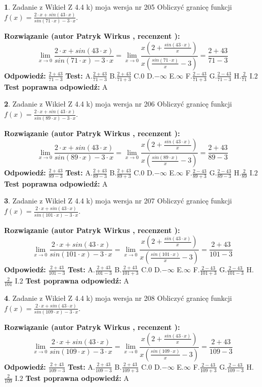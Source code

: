 \documentclass[12pt, a4paper]{article}
\theoremstyle{definition} %
\newtheorem{zad}{}
\newcommand{\zadStart}[1]{\begin{zad}#1\newline}
\newcommand{\zadStop}{\end{zad}}
\newcommand{\rozwStart}[2]{\noindent \textbf{Rozwiązanie (autor #1 , recenzent #2): }\newline}
\newcommand{\rozwStop}{\newline}
\newcommand{\odpStart}{\noindent \textbf{Odpowiedź:}\newline}
\newcommand{\odpStop}{\newline}
\newcommand{\testStart}{\noindent \textbf{Test:}\newline}
\newcommand{\testStop}{\newline}
\newcommand{\kluczStart}{\noindent \textbf{Test poprawna odpowiedź:}\newline}
\newcommand{\kluczStop}{\newline}
\begin{document}
\zadStart{Zadanie z Wikieł Z 4.4 k) moja wersja nr 205}
Obliczyć granicę funkcji $f(x)=\frac{2\cdot x +sin(43\cdot x)}{sin(71\cdot x) -3\cdot x}$.
\zadStop
\rozwStart{Patryk Wirkus}{}
$$\lim\limits_{x\to 0}\frac{2\cdot x +sin(43\cdot x)}{sin(71\cdot x) -3\cdot x}
=\lim\limits_{x\to 0}\frac{x(2+\frac{sin(43\cdot x)}{x})}{x(\frac{sin(71\cdot x)}{x}-3)}
=\frac{2+43}{71-3}$$
\rozwStop
\odpStart
$\frac{2+43}{71-3}$
\odpStop
\testStart
A.$\frac{2+43}{71-3}$
B.$\frac{2+43}{71+3}$
C.$0$
D.$-\infty$
E.$\infty$
F.$\frac{2-43}{71+3}$
G.$\frac{2-43}{71-3}$
H.$\frac{2}{71}$
I.$2$
\testStop
\kluczStart
A
\kluczStop



\zadStart{Zadanie z Wikieł Z 4.4 k) moja wersja nr 206}
Obliczyć granicę funkcji $f(x)=\frac{2\cdot x +sin(43\cdot x)}{sin(89\cdot x) -3\cdot x}$.
\zadStop
\rozwStart{Patryk Wirkus}{}
$$\lim\limits_{x\to 0}\frac{2\cdot x +sin(43\cdot x)}{sin(89\cdot x) -3\cdot x}
=\lim\limits_{x\to 0}\frac{x(2+\frac{sin(43\cdot x)}{x})}{x(\frac{sin(89\cdot x)}{x}-3)}
=\frac{2+43}{89-3}$$
\rozwStop
\odpStart
$\frac{2+43}{89-3}$
\odpStop
\testStart
A.$\frac{2+43}{89-3}$
B.$\frac{2+43}{89+3}$
C.$0$
D.$-\infty$
E.$\infty$
F.$\frac{2-43}{89+3}$
G.$\frac{2-43}{89-3}$
H.$\frac{2}{89}$
I.$2$
\testStop
\kluczStart
A
\kluczStop



\zadStart{Zadanie z Wikieł Z 4.4 k) moja wersja nr 207}
Obliczyć granicę funkcji $f(x)=\frac{2\cdot x +sin(43\cdot x)}{sin(101\cdot x) -3\cdot x}$.
\zadStop
\rozwStart{Patryk Wirkus}{}
$$\lim\limits_{x\to 0}\frac{2\cdot x +sin(43\cdot x)}{sin(101\cdot x) -3\cdot x}
=\lim\limits_{x\to 0}\frac{x(2+\frac{sin(43\cdot x)}{x})}{x(\frac{sin(101\cdot x)}{x}-3)}
=\frac{2+43}{101-3}$$
\rozwStop
\odpStart
$\frac{2+43}{101-3}$
\odpStop
\testStart
A.$\frac{2+43}{101-3}$
B.$\frac{2+43}{101+3}$
C.$0$
D.$-\infty$
E.$\infty$
F.$\frac{2-43}{101+3}$
G.$\frac{2-43}{101-3}$
H.$\frac{2}{101}$
I.$2$
\testStop
\kluczStart
A
\kluczStop



\zadStart{Zadanie z Wikieł Z 4.4 k) moja wersja nr 208}
Obliczyć granicę funkcji $f(x)=\frac{2\cdot x +sin(43\cdot x)}{sin(109\cdot x) -3\cdot x}$.
\zadStop
\rozwStart{Patryk Wirkus}{}
$$\lim\limits_{x\to 0}\frac{2\cdot x +sin(43\cdot x)}{sin(109\cdot x) -3\cdot x}
=\lim\limits_{x\to 0}\frac{x(2+\frac{sin(43\cdot x)}{x})}{x(\frac{sin(109\cdot x)}{x}-3)}
=\frac{2+43}{109-3}$$
\rozwStop
\odpStart
$\frac{2+43}{109-3}$
\odpStop
\testStart
A.$\frac{2+43}{109-3}$
B.$\frac{2+43}{109+3}$
C.$0$
D.$-\infty$
E.$\infty$
F.$\frac{2-43}{109+3}$
G.$\frac{2-43}{109-3}$
H.$\frac{2}{109}$
I.$2$
\testStop
\kluczStart
A
\kluczStop
\end{document}
